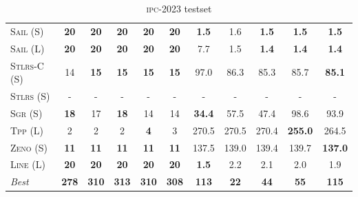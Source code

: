 \begin{table}[tb]
{\begin{tabular}{|l||ccccc||ccccc||}
\textsc{Sail} (S)&\textbf{20}&\textbf{20}&\textbf{20}&\textbf{20}&\textbf{20}&\textbf{1.5}&1.6&\textbf{1.5}&\textbf{1.5}&\textbf{1.5}\\
\textsc{Sail} (L)&\textbf{20}&\textbf{20}&\textbf{20}&\textbf{20}&\textbf{20}&7.7&1.5&\textbf{1.4}&\textbf{1.4}&\textbf{1.4}\\
\textsc{Stlrs-C} (S)&14&\textbf{15}&\textbf{15}&\textbf{15}&\textbf{15}&97.0&86.3&85.3&85.7&\textbf{85.1}\\
\textsc{Stlrs} (S)&-&-&-&-&-&-&-&-&-&-\\
\textsc{Sgr} (S)&\textbf{18}&17&\textbf{18}&14&14&\textbf{34.4}&57.5&47.4&98.6&93.9\\
\textsc{Tpp} (L)&2&2&2&\textbf{4}&3&270.5&270.5&270.4&\textbf{255.0}&264.5\\
\textsc{Zeno} (S)&\textbf{11}&\textbf{11}&\textbf{11}&\textbf{11}&\textbf{11}&137.5&139.0&139.4&139.7&\textbf{137.0}\\
\textsc{Line} (L)&\textbf{20}&\textbf{20}&\textbf{20}&\textbf{20}&\textbf{20}&\textbf{1.5}&2.2&2.1&2.0&1.9
\\\hline
\textit{Best}&\textbf{278}&\textbf{310}&\textbf{313}&\textbf{310}&\textbf{308}&\textbf{113}&\textbf{22}&\textbf{44}&\textbf{55}&\textbf{115}\\\hline

        \end{tabular}}
        \caption{\textsc{ipc}-2023 testset}
        \label{tab:ipc}
        \end{table}
        